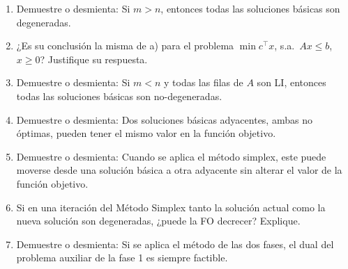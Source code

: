 \documentclass[12pt]{article}
\theoremstyle{plain}
\begin{document}
\begin{enumerate}[label=\alph*)]
      \item Demuestre o desmienta: Si $m > n$, entonces todas las soluciones básicas son
            degeneradas.

      \item ¿Es su conclusión la misma de a) para el problema $\min c^{\top}x$, s.a.\
            $Ax \leq b$, $x \geq 0$? Justifique su respuesta.

      \item Demuestre o desmienta: Si $m < n$ y todas las filas de $A$ son LI, entonces
            todas las soluciones básicas son no-degeneradas.

      \item Demuestre o desmienta: Dos soluciones básicas adyacentes, ambas no
            óptimas, pueden tener el mismo valor en la función objetivo.

      \item Demuestre o desmienta: Cuando se aplica el método simplex, este puede
            moverse desde una solución básica a otra adyacente sin alterar el valor de la
            función objetivo.

      \item Si en una iteración del Método Simplex tanto la solución actual como la nueva
            solución son degeneradas, ¿puede la FO decrecer? Explique.

      \item Demuestre o desmienta: Si se aplica el método de las dos fases, el dual del
            problema auxiliar de la fase 1 es siempre factible.
\end{enumerate}
\end{document}
